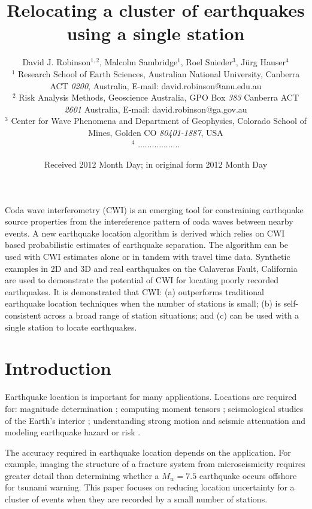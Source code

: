 \documentclass[extra]{gji}
\title{Relocating a cluster of earthquakes using a single station}
\author[D.J. Robinson, M. Sambridge, R. Snieder and J Hauser]
  {David J. Robinson$^{1,2}$, Malcolm Sambridge$^{1}$, Roel Snieder$^{3}$, J\"urg Hauser$^{4}$ \\
  $^1$ Research School of Earth Sciences, Australian National
    University, Canberra ACT \emph{0200}, Australia, E-mail: david.robinson@anu.edu.au \\
$^2$  Risk Analysis Methods, Geoscience Australia, GPO Box \emph{383} Canberra ACT \emph{2601} Australia, E-mail: david.robinson@ga.gov.au\\
$^3$ Center for Wave Phenomena and Department of Geophysics, Colorado School of Mines, Golden CO \emph{80401-1887}, USA \\
$^4$ ..................}
\date{Received 2012 Month Day; in original form 2012 Month Day}
\begin{document}
\label{firstpage}

\maketitle


\begin{summary}
 Coda wave interferometry (CWI) is an emerging tool for constraining
earthquake source properties from the intereference pattern of coda
waves between nearby events. A new earthquake location algorithm is
derived which relies on CWI based probabilistic estimates of
earthquake separation. The algorithm can be used with CWI estimates
alone or in tandem with travel time data. Synthetic examples in 2D
and 3D and real earthquakes on the Calaveras Fault, California are
used to demonstrate the potential of CWI for locating poorly
recorded earthquakes. It is demonstrated that CWI: (a) outperforms
traditional earthquake location techniques when the number of
stations is small; (b) is self-consistent across a broad range of
station situations; and (c) can be used with a single station to
locate earthquakes.

\end{summary}


\section{Introduction}

Earthquake location is important for many applications. Locations
are required for:  magnitude
determination \citep{dr_Richter35a, dr_Gutenberg45a};
computing moment tensors \citep{dr_Sipkin02a};
seismological studies of the Earth's interior
\citep{dr_Spencer80a, dr_Kennett95a, dr_Curtis02a, dr_Kennett04a};
understanding strong motion and seismic attenuation
\citep{dr_Toro97a, dr_Campbell03a}
 and modeling earthquake hazard or risk
\citep{dr_Frankel00a, dr_Stirling02a, dr_Robinson06b}.

The accuracy required in earthquake location depends on the
application. For example, imaging the structure of a fracture system
from microseismicity requires greater detail than determining
whether a $M_w=7.5$ earthquake occurs offshore for tsunami warning.
 This paper focuses on reducing location uncertainty for
a cluster of events when they are recorded by a small
number of stations.
\end{document}
